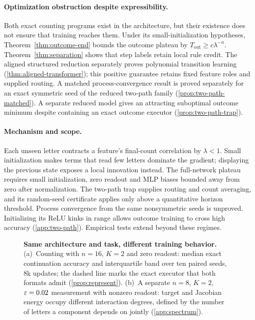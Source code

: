 \paragraph{Optimization obstruction despite expressibility.}
Both exact counting programs exist in the architecture, but their existence does
not ensure that training reaches them. Under its small-initialization hypotheses,
Theorem~\ref{thm:outcome-end} bounds the outcome plateau by
$T_{\mathrm{out}}\ge c\lambda^{-n}$. Theorem~\ref{thm:separation} shows that
step labels retain local rule credit. The aligned structured reduction separately
proves polynomial transition learning (\cref{thm:aligned-transformer}); this
positive guarantee retains fixed feature roles and supplied routing.
A matched process-convergence result is proved separately for an exact symmetric
seed of the reduced two-path family (\cref{prop:two-path-matched}).
A separate reduced model gives an attracting suboptimal outcome minimum despite
containing an exact outcome executor (\cref{prop:two-path-trap}).

\paragraph{Mechanism and scope.}
Each unseen letter contracts a feature's final-count correlation by $\lambda<1$.
Small initialization makes terms that read few letters dominate the gradient;
displaying the previous state exposes a local innovation instead.
The full-network plateau requires small initialization, zero readout and MLP
biases bounded away from zero after normalization. The two-path trap supplies
routing and count averaging, and its random-seed certificate applies only above a quantitative horizon
threshold. Process convergence from the same nonsymmetric seeds is unproved. Initializing its ReLU kinks in range allows outcome training
to cross high accuracy (\cref{app:two-path}). Empirical tests extend beyond these regimes.

\begin{figure}[t]
\centering

\caption{\textbf{Same architecture and task, different training behavior.}
(a)~Counting with $n=16$, $K=2$ and zero readout: median exact continuation accuracy and interquartile band over ten paired seeds, $8$k
updates; the dashed line marks the exact executor that both formats admit (\cref{prop:represent}).
(b)~A separate $n=8$, $K=2$, $\varepsilon=0.02$ measurement with nonzero readout: target and Jacobian energy occupy different interaction degrees, defined by the number of letters a component depends on jointly (\cref{app:spectrum}).}
\label{fig:overview}
\end{figure}

